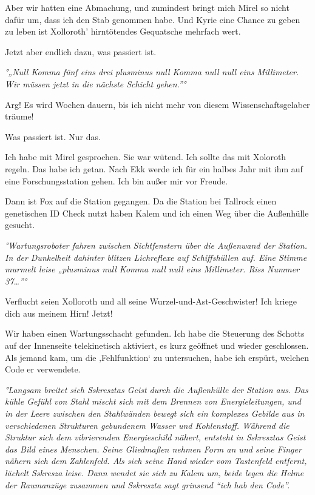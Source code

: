 \documentclass[11pt]{article}
\begin{document}
Aber wir hatten eine Abmachung, und zumindest bringt mich Mirel so nicht
dafür um, dass ich den Stab genommen habe. Und Kyrie eine Chance zu
geben zu leben ist Xolloroth' hirntötendes Gequatsche mehrfach wert.

Jetzt aber endlich dazu, was passiert ist.

\emph{°„Null Komma fünf eins drei plusminus null Komma null null eins
Millimeter. Wir müssen jetzt in die nächste Schicht gehen.''°}

Arg! Es wird Wochen dauern, bis ich nicht mehr von diesem
Wissenschaftsgelaber träume!

Was passiert ist. Nur das.

Ich habe mit Mirel gesprochen. Sie war wütend. Ich sollte das mit
Xoloroth regeln. Das habe ich getan. Nach Ekk werde ich für ein halbes
Jahr mit ihm auf eine Forschungsstation gehen. Ich bin außer mir vor
Freude.

Dann ist Fox auf die Station gegangen. Da die Station bei Tallrock einen
genetischen ID Check nutzt haben Kalem und ich einen Weg über die
Außenhülle gesucht.

\emph{°Wartungsroboter fahren zwischen Sichtfenstern über die Außenwand
der Station. In der Dunkelheit dahinter blitzen Lichreflexe auf
Schiffshüllen auf. Eine Stimme murmelt leise „plusminus null Komma null
null eins Millimeter. Riss Nummer 37\ldots{}''°}

Verflucht seien Xolloroth und all seine Wurzel-und-Ast-Geschwister! Ich
kriege dich aus meinem Hirn! Jetzt!

Wir haben einen Wartungsschacht gefunden. Ich habe die Steuerung des
Schotts auf der Innenseite telekinetisch aktiviert, es kurz geöffnet und
wieder geschlossen. Als jemand kam, um die ‚Fehlfunktion` zu
untersuchen, habe ich erspürt, welchen Code er verwendete.

\emph{°Langsam breitet sich Sskresztas Geist durch die Außenhülle der
Station aus. Das kühle Gefühl von Stahl mischt sich mit dem Brennen von
Energieleitungen, und in der Leere zwischen den Stahlwänden bewegt sich
ein komplexes Gebilde aus in verschiedenen Strukturen gebundenem Wasser
und Kohlenstoff. Während die Struktur sich dem vibrierenden
Energieschild nähert, entsteht in Sskresztas Geist das Bild eines
Menschen. Seine Gliedmaßen nehmen Form an und seine Finger nähern sich
dem Zahlenfeld. Als sich seine Hand wieder vom Tastenfeld entfernt,
lächelt Sskresza leise. Dann wendet sie sich zu Kalem um, beide legen
die Helme der Raumanzüge zusammen und Sskreszta sagt grinsend ``ich hab
den Code''.}
\end{document}
